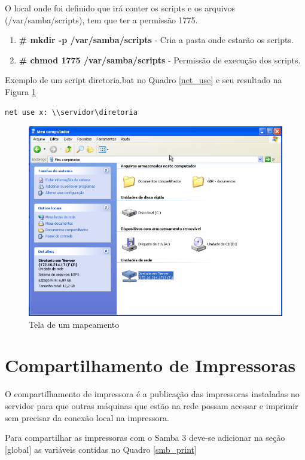 O local onde foi definido que irá conter os scripts e os arquivos (/var/samba/scripts), tem que ter a permissão 1775. 

\begin{enumerate}
	\item \textbf{\# mkdir -p /var/samba/scripts} - Cria a pasta onde estarão os scripts.
	\item \textbf{\# chmod 1775 /var/samba/scripts} - Permissão de execução dos scripts.
\end{enumerate}

Exemplo de um script diretoria.bat no Quadro \ref{net_use} e seu resultado na Figura \ref{mapeamento}\\

\begin{lstlisting}[caption=Comando para mapeamento automático de uma pasta compartilhada,label={net_use}]
net use x: \\servidor\diretoria
\end{lstlisting}

\begin{figure}[h!]
   	\centering
    \includegraphics[width=0.7 \textwidth]{figuras/mapeamento}
   	\caption{Tela de um mapeamento}
    \label{mapeamento}
\end{figure}

\section{Compartilhamento de Impressoras}

O compartilhamento de impressora é a publicação das impressoras instaladas no servidor para que outras máquinas que estão na rede possam acessar e imprimir sem precisar da conexão local na impressora.

Para compartilhar as impressoras com o Samba 3 deve-se adicionar na seção [global] as variáveis contidas no Quadro \ref{smb_print}\\

